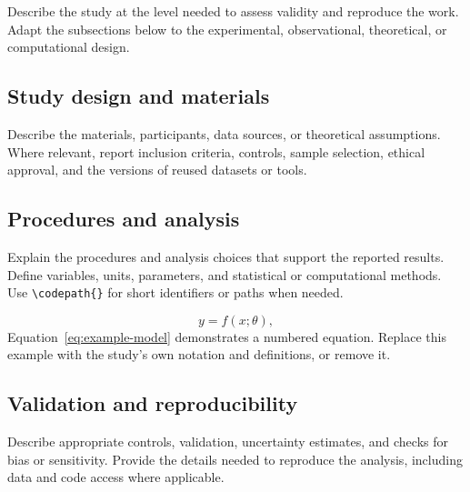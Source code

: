 Describe the study at the level needed to assess validity and reproduce the work. Adapt the subsections below to the experimental, observational, theoretical, or computational design.

\subsection{Study design and materials}
Describe the materials, participants, data sources, or theoretical assumptions. Where relevant, report inclusion criteria, controls, sample selection, ethical approval, and the versions of reused datasets or tools.

\subsection{Procedures and analysis}
Explain the procedures and analysis choices that support the reported results. Define variables, units, parameters, and statistical or computational methods. Use \verb|\codepath{}| for short identifiers or paths when needed.

\begin{equation}
  y = f(x;\theta),
  \label{eq:example-model}
\end{equation}
Equation~\ref{eq:example-model} demonstrates a numbered equation. Replace this example with the study's own notation and definitions, or remove it.

\subsection{Validation and reproducibility}
Describe appropriate controls, validation, uncertainty estimates, and checks for bias or sensitivity. Provide the details needed to reproduce the analysis, including data and code access where applicable.
